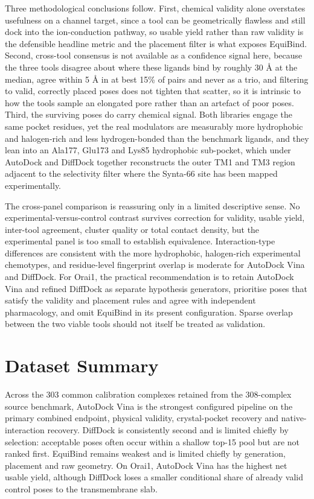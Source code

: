 Three methodological conclusions follow. First, chemical validity alone overstates usefulness on a channel target, since a tool can be geometrically flawless and still dock into the ion-conduction pathway, so usable yield rather than raw validity is the defensible headline metric and the placement filter is what exposes EquiBind. Second, cross-tool consensus is not available as a confidence signal here, because the three tools disagree about where these ligands bind by roughly 30 Å at the median, agree within 5 Å in at best 15\% of pairs and never as a trio, and filtering to valid, correctly placed poses does not tighten that scatter, so it is intrinsic to how the tools sample an elongated pore rather than an artefact of poor poses. Third, the surviving poses do carry chemical signal. Both libraries engage the same pocket residues, yet the real modulators are measurably more hydrophobic and halogen-rich and less hydrogen-bonded than the benchmark ligands, and they lean into an Ala177, Glu173 and Lys85 hydrophobic sub-pocket, which under AutoDock and DiffDock together reconstructs the outer TM1 and TM3 region adjacent to the selectivity filter where the Synta-66 site has been mapped experimentally.

The cross-panel comparison is reassuring only in a limited descriptive sense. No experimental-versus-control contrast survives correction for validity, usable yield, inter-tool agreement, cluster quality or total contact density, but the experimental panel is too small to establish equivalence. Interaction-type differences are consistent with the more hydrophobic, halogen-rich experimental chemotypes, and residue-level fingerprint overlap is moderate for AutoDock Vina and DiffDock. For Orai1, the practical recommendation is to retain AutoDock Vina and refined DiffDock as separate hypothesis generators, prioritise poses that satisfy the validity and placement rules and agree with independent pharmacology, and omit EquiBind in its present configuration. Sparse overlap between the two viable tools should not itself be treated as validation.

\protect\hypertarget{_Toc235735941}{}{}

\hypertarget{dataset-summary}{%
\section{Dataset Summary}\label{dataset-summary}}

Across the 303 common calibration complexes retained from the 308-complex source benchmark, AutoDock Vina is the strongest configured pipeline on the primary combined endpoint, physical validity, crystal-pocket recovery and native-interaction recovery. DiffDock is consistently second and is limited chiefly by selection: acceptable poses often occur within a shallow top-15 pool but are not ranked first. EquiBind remains weakest and is limited chiefly by generation, placement and raw geometry. On Orai1, AutoDock Vina has the highest net usable yield, although DiffDock loses a smaller conditional share of already valid control poses to the transmembrane slab.

